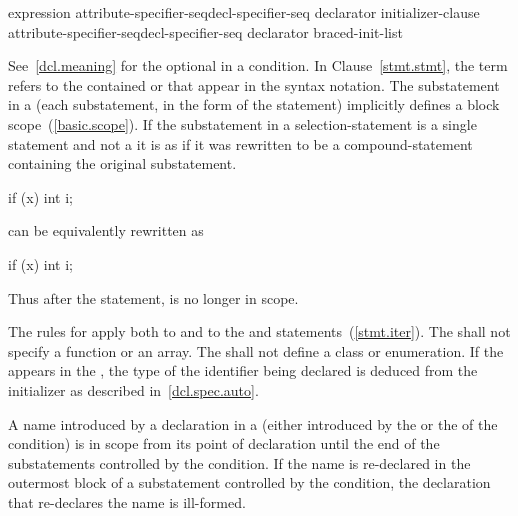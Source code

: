 \begin{bnf}
\br
    expression\br
    attribute-specifier-seq\opt decl-specifier-seq declarator \terminal{=} initializer-clause\br
    attribute-specifier-seq\opt decl-specifier-seq declarator braced-init-list
\end{bnf}

See~\ref{dcl.meaning} for the optional  in a condition.
In Clause~\ref{stmt.stmt}, the term  refers to
the contained  or  that appear
in the syntax notation.
%
The substatement in a  (each substatement,
in the  form of the  statement) implicitly defines
a block scope~(\ref{basic.scope}). If the substatement in a
selection-statement is a single statement and not a
 it is as if it was rewritten to be a
compound-statement containing the original substatement.
\enterexample

\begin{codeblock}
if (x)
  int i;
\end{codeblock}

can be equivalently rewritten as

\begin{codeblock}
if (x) {
  int i;
}
\end{codeblock}

Thus after the  statement,  is no longer in scope.
\exitexample

\pnum
{}%
The rules for  apply both to
 and to the  and 
statements~(\ref{stmt.iter}). The  shall not
specify a function or an array. The  shall not
define a class or enumeration. If the   appears in
the ,
the type of the identifier being declared is deduced from the initializer as described in~\ref{dcl.spec.auto}.

\pnum
{}%
%
A name introduced by a declaration in a  (either
introduced by the  or the
 of the condition) is in scope from its point of
declaration until the end of the substatements controlled by the
condition. If the name is re-declared in the outermost block of a
substatement controlled by the condition, the declaration that
re-declares the name is ill-formed.
\enterexample


